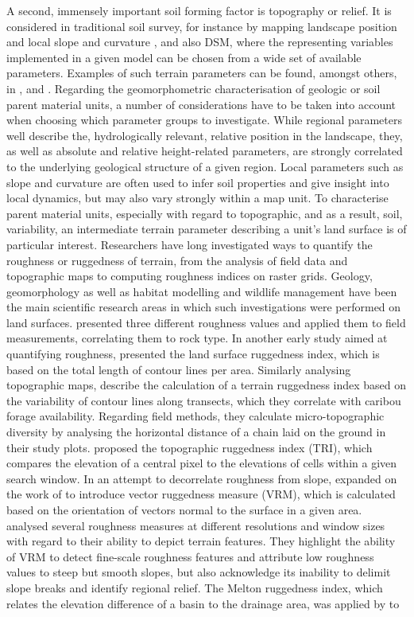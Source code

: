 \documentclass[preprint,12pt,authoryear]{elsarticle}
\begin{document}
A second, immensely important soil forming factor is topography or relief. It is considered in traditional soil survey, for instance by mapping landscape position and local slope and curvature \citep{FAO2006}, and also DSM, where the representing variables implemented in a given model can be chosen from a wide set of available parameters. Examples of such terrain parameters can be found, amongst others, in \cite{Boehner2009},\cite{Gallant2000} and \cite{Olaya2009141} . Regarding the geomorphometric characterisation of geologic or soil parent material units, a number of considerations have to be taken into account when choosing which parameter groups to investigate. While regional parameters well describe the, hydrologically relevant, relative position in the landscape, they, as well as absolute and relative height-related parameters, are strongly correlated to the underlying geological structure of a given region. Local parameters such as slope and curvature are often used to infer soil properties and give insight into local dynamics, but may also vary strongly within a map unit. To characterise parent material units, especially with regard to topographic, and as a result, soil, variability, an intermediate terrain parameter describing a unit's land surface is of particular interest. Researchers have long investigated ways to quantify the roughness or ruggedness of terrain, from the analysis of field data and topographic maps to computing roughness indices on raster grids. Geology, geomorphology as well as habitat modelling and wildlife management have been the main scientific research areas in which such investigations were performed on land surfaces.  \cite{Hobson1972} presented three different roughness values and applied them to field measurements, correlating them to rock type. In another early study aimed at quantifying roughness, \cite{Beasom1983} presented the land surface ruggedness index, which is based on the total length of contour lines per area. Similarly analysing topographic maps, \cite{Nellemann1994} describe the calculation of a terrain ruggedness index based on the variability of contour lines along transects, which they correlate with caribou forage availability. Regarding field methods, they calculate micro-topographic diversity by analysing the horizontal distance of a chain laid on the ground in their study plots. \cite{Riley1999} proposed the topographic ruggedness index (TRI), which compares the elevation of a central pixel to the elevations of cells within a given search window. In an attempt to decorrelate roughness from slope, \cite{Sappington2007} expanded on the work of \cite{Hobson1972} to introduce vector ruggedness measure (VRM), which is calculated based on the orientation of vectors normal to the surface in a given area. \citep{Grohmann2010} analysed several roughness measures at different resolutions and window sizes with regard to their ability to depict terrain features. They highlight the ability of VRM to detect fine-scale roughness features and attribute low roughness values to steep but smooth slopes, but also acknowledge its inability to delimit slope breaks and identify regional relief. The Melton ruggedness index, which relates  the elevation difference of a basin to the drainage area, was applied by \cite{Marchi2005} to 
\end{document}
